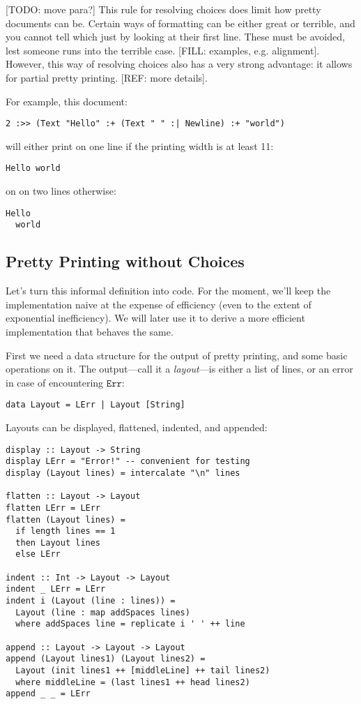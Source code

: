 \documentclass{article}
\newcommand{\err}{\texttt{Err}}
\begin{document}
[TODO: move para?] This rule for resolving choices does limit how pretty documents can be. Certain
ways of formatting can be either great or terrible, and you cannot tell which just by looking at
their first line.  These must be avoided, lest someone runs into the terrible case. [FILL: examples,
e.g. alignment].  However, this way of resolving choices also has a very strong advantage: it allows
for partial pretty printing. [REF: more details].

For example, this document:
\begin{lstlisting}
2 :>> (Text "Hello" :+ (Text " " :| Newline) :+ "world")
\end{lstlisting}
will either print on one line if the printing width is at least 11:
\begin{lstlisting}
Hello world
\end{lstlisting}
on on two lines otherwise:
\begin{lstlisting}
Hello
  world
\end{lstlisting}

\subsection{Pretty Printing without Choices}

Let's turn this informal definition into code. For the moment, we'll keep the implementation naive
at the expense of efficiency (even to the extent of exponential inefficiency). We will later use it to
derive a more efficient implementation that behaves the same.

First we need a data structure for the output of pretty printing, and some basic operations on it.
The output---call it a \emph{layout}---is either a list of lines, or an error in case of
encountering $\err$:

\begin{lstlisting}
data Layout = LErr | Layout [String]
\end{lstlisting}

Layouts can be displayed, flattened, indented, and appended:

\begin{lstlisting}
display :: Layout -> String
display LErr = "Error!" -- convenient for testing
display (Layout lines) = intercalate "\n" lines

flatten :: Layout -> Layout
flatten LErr = LErr
flatten (Layout lines) =
  if length lines == 1
  then Layout lines
  else LErr

indent :: Int -> Layout -> Layout
indent _ LErr = LErr
indent i (Layout (line : lines)) =
  Layout (line : map addSpaces lines)
  where addSpaces line = replicate i ' ' ++ line

append :: Layout -> Layout -> Layout
append (Layout lines1) (Layout lines2) =
  Layout (init lines1 ++ [middleLine] ++ tail lines2)
  where middleLine = (last lines1 ++ head lines2)
append _ _ = LErr
\end{lstlisting}
\end{document}
